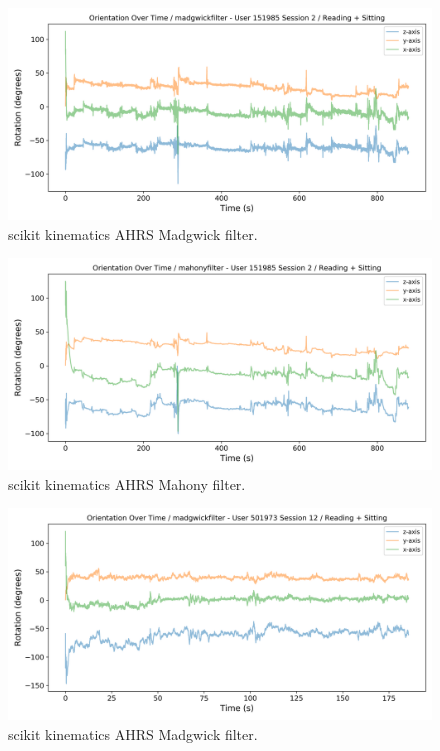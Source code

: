 \documentclass{article}
\begin{document}
\begin{figure}[ht] %
  \includegraphics[width=1\linewidth]{images/151985_2_madgwickfilter.png}
  \caption[]{scikit kinematics AHRS Madgwick filter.}
  \label{fig:151985_2_madgwick}
\end{figure}

\begin{figure}[ht]
  \includegraphics[width=1\linewidth]{images/151985_2_mahonyfilter.png}
  \caption[]{scikit kinematics AHRS Mahony filter.}
  \label{fig:151985_2_mahony}
\end{figure}

\begin{figure}[ht] %
  \includegraphics[width=1\linewidth]{images/501973_12_madgwickfilter.png}
  \caption[]{scikit kinematics AHRS Madgwick filter.}
  \label{fig:501973_12_madgwick}
\end{figure}
\end{document}
